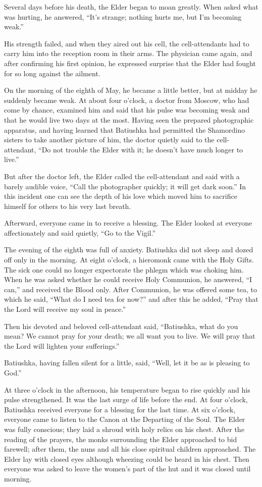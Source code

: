 Several days before his death, the Elder began to moan greatly. When asked what was hurting, he answered, ``It's strange; nothing hurts me, but I'm becoming weak.''

His strength failed, and when they aired out his cell, the cell-attendants had to carry him into the reception room in their arms. The physician came again, and after confirming his first opinion, he expressed surprise that the Elder had fought for so long against the ailment.

On the morning of the eighth of May, he became a little better, but at midday he suddenly became weak. At about four o'clock, a doctor from Moscow, who had come by chance, examined him and said that his pulse was becoming weak and that he would live two days at the most. Having seen the prepared photographic apparatus, and having learned that Batiushka had permitted the Shamordino sisters to take another picture of him, the doctor quietly said to the cell-attendant, ``Do not trouble the Elder with it; he doesn't have much longer to live.''

But after the doctor left, the Elder called the cell-attendant and said with a barely audible voice, ``Call the photographer quickly; it will get dark soon.'' In this incident one can see the depth of his love which moved him to sacrifice himself for others to his very last breath.

Afterward, everyone came in to receive a blessing. The Elder looked at everyone affectionately and said quietly, ``Go to the Vigil.''

The evening of the eighth was full of anxiety. Batiushka did not sleep and dozed off only in the morning. At eight o'clock, a hieromonk came with the Holy Gifts. The sick one could no longer expectorate the phlegm which was choking him. When he was asked whether he could receive Holy Communion, he answered, ``I can,'' and received the Blood only. After Communion, he was offered some tea, to which he said, ``What do I need tea for now?'' and after this he added, ``Pray that the Lord will receive my soul in peace.''

Then his devoted and beloved cell-attendant said, ``Batiushka, what do you mean? We cannot pray for your death; we all want you to live. We will pray that the Lord will lighten your sufferings.''

Batiushka, having fallen silent for a little, said, ``Well, let it be as is pleasing to God.''

At three o'clock in the afternoon, his temperature began to rise quickly and his pulse strengthened. It was the last surge of life before the end. At four o'clock, Batiushka received everyone for a blessing for the last time. At six o'clock, everyone came to listen to the Canon at the Departing of the Soul. The Elder was fully conscious; they laid a shroud with holy relics on his chest. After the reading of the prayers, the monks surrounding the Elder approached to bid farewell; after them, the nuns and all his close spiritual children approached. The Elder lay with closed eyes although wheezing could be heard in his chest. Then everyone was asked to leave the women's part of the hut and it was closed until morning.

